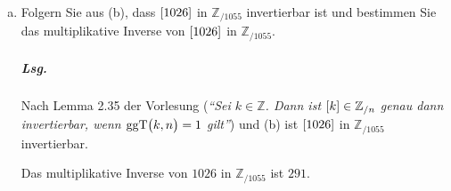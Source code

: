 \documentclass{scrreprt}
\newcommand\ggT{\text{ggT}}
\begin{document}
\begin{enumerate}[(a)]
\item Folgern Sie aus (b), dass $\qty[1026]$ in $\mathbb{Z}_{/ 1055}$
  invertierbar ist und bestimmen Sie das multiplikative Inverse von
  $\qty[1026]$ in $\mathbb{Z}_{/ 1055}$.

  \subparagraph{Lsg.} Nach Lemma 2.35 der Vorlesung (\emph{``Sei
    $k \in \mathbb{Z}$. Dann ist $\qty[k] \in \mathbb{Z}_{/ n}$
    genau dann invertierbar, wenn $\ggT\qty\big(k, n) = 1$ gilt''}) und
  (b) ist $\qty[1026]$ in $\mathbb{Z}_{/ 1055}$ invertierbar.

  Das multiplikative Inverse von $1026$ in $\mathbb{Z}_{/ 1055}$ ist $291$.
\end{enumerate}
\end{document}
